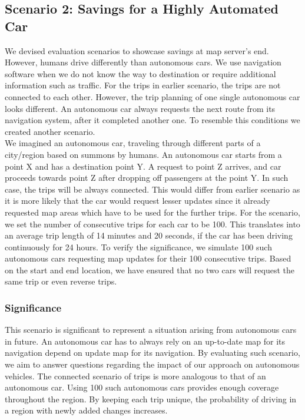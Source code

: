 \subsection{Scenario 2: Savings for a Highly Automated Car} \label{scenario3}
We devised evaluation scenarios to showcase savings at map server's end. However, humans drive differently than autonomous cars. We use navigation software when we do not know the way to destination or require additional information such as traffic. For the trips in earlier scenario, the trips are not connected to each other. However, the trip planning of one single autonomous car looks different. An autonomous car always requests the next route from its navigation system, after it completed another one. To resemble this conditions we created another scenario. \\

We imagined an autonomous car, traveling through different parts of a city/region based on summons by humans. An autonomous car starts from a point X and has a destination point Y. A request to point Z arrives, and car proceeds towards point Z after dropping off passengers at the point Y. In such case, the trips will be always connected. This would differ from earlier scenario as it is more likely that the car would request lesser updates since it already requested map areas which have to be used for the further trips. For the scenario, we set the number of consecutive trips for each car to be 100. This translates into an average trip length of 14 minutes and 20 seconds, if the car has been driving continuously for 24 hours. To verify the significance, we simulate 100 such autonomous cars requesting map updates for their 100 consecutive trips. Based on the start and end location, we have ensured that no two cars will request the same trip or even reverse trips. 

\subsubsection{Significance}
This scenario is significant to represent a situation arising from autonomous cars in future. An autonomous car has to always rely on an up-to-date map for its navigation depend on update map for its navigation. By evaluating such scenario, we aim to answer questions regarding the impact of our approach on autonomous vehicles. The connected scenario of trips is more analogous to that of an autonomous car. Using 100 such autonomous cars provides enough coverage throughout the region. By keeping each trip unique, the probability of driving in a region with newly added changes increases. 

